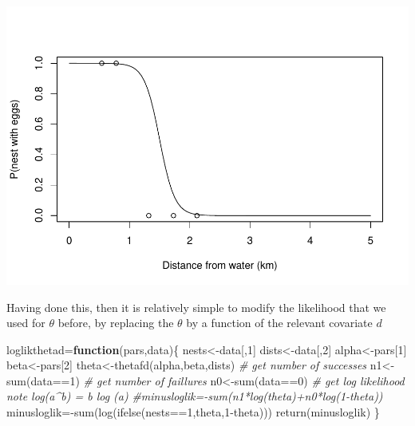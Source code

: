 \documentclass[
]{book}
\newenvironment{Shaded}{\begin{snugshade}}{\end{snugshade}}
\newcommand{\CommentTok}[1]{\textcolor[rgb]{0.56,0.35,0.01}{\textit{#1}}}
\newcommand{\ControlFlowTok}[1]{\textcolor[rgb]{0.13,0.29,0.53}{\textbf{#1}}}
\newcommand{\DecValTok}[1]{\textcolor[rgb]{0.00,0.00,0.81}{#1}}
\newcommand{\FunctionTok}[1]{\textcolor[rgb]{0.00,0.00,0.00}{#1}}
\newcommand{\NormalTok}[1]{#1}
\newcommand{\OtherTok}[1]{\textcolor[rgb]{0.56,0.35,0.01}{#1}}
\newcommand{\SpecialCharTok}[1]{\textcolor[rgb]{0.00,0.00,0.00}{#1}}
\begin{document}
\includegraphics{ECOMODbook_files/figure-latex/ch13.33-1.pdf}

Having done this, then it is relatively simple to modify the likelihood that we used for \(\theta\) before, by replacing the \(\theta\) by a function of the relevant covariate \(d\)

\begin{Shaded}
\begin{Highlighting}[]
\NormalTok{loglikthetad}\OtherTok{=}\ControlFlowTok{function}\NormalTok{(pars,data)\{}
\NormalTok{  nests}\OtherTok{\textless{}{-}}\NormalTok{data[,}\DecValTok{1}\NormalTok{]}
\NormalTok{  dists}\OtherTok{\textless{}{-}}\NormalTok{data[,}\DecValTok{2}\NormalTok{]}
\NormalTok{  alpha}\OtherTok{\textless{}{-}}\NormalTok{pars[}\DecValTok{1}\NormalTok{]}
\NormalTok{  beta}\OtherTok{\textless{}{-}}\NormalTok{pars[}\DecValTok{2}\NormalTok{]}
\NormalTok{  theta}\OtherTok{\textless{}{-}}\FunctionTok{thetafd}\NormalTok{(alpha,beta,dists)}
  \CommentTok{\# get number of successes}
\NormalTok{  n1}\OtherTok{\textless{}{-}}\FunctionTok{sum}\NormalTok{(data}\SpecialCharTok{==}\DecValTok{1}\NormalTok{)}
  \CommentTok{\# get number of faillures}
\NormalTok{  n0}\OtherTok{\textless{}{-}}\FunctionTok{sum}\NormalTok{(data}\SpecialCharTok{==}\DecValTok{0}\NormalTok{)}
  \CommentTok{\# get log likelihood note log(a\^{}b) = b log (a)}
  \CommentTok{\#minusloglik={-}sum(n1*log(theta)+n0*log(1{-}theta))}
\NormalTok{  minusloglik}\OtherTok{=}\SpecialCharTok{{-}}\FunctionTok{sum}\NormalTok{(}\FunctionTok{log}\NormalTok{(}\FunctionTok{ifelse}\NormalTok{(nests}\SpecialCharTok{==}\DecValTok{1}\NormalTok{,theta,}\DecValTok{1}\SpecialCharTok{{-}}\NormalTok{theta)))}
  \FunctionTok{return}\NormalTok{(minusloglik)}
\NormalTok{\}}
\end{Highlighting}
\end{Shaded}
\end{document}
